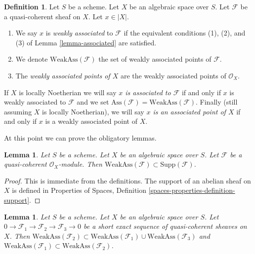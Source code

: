 \documentclass{stacks-project}
\theoremstyle{plain}
\newtheorem{lemma}[subsection]{Lemma}
\theoremstyle{definition}
\newtheorem{definition}[subsection]{Definition}
\theoremstyle{remark}
\numberwithin{equation}{subsection}
\begin{document}
\begin{definition}
\label{definition-weakly-associated}
Let $S$ be a scheme. Let $X$ be an algebraic space over $S$.
Let $\mathcal{F}$ be a quasi-coherent sheaf on $X$.
Let $x \in |X|$.
\begin{enumerate}
\item We say $x$ is {\it weakly associated} to $\mathcal{F}$
if the equivalent conditions (1), (2), and (3) of
Lemma \ref{lemma-associated} are satisfied.
\item We denote $\text{WeakAss}(\mathcal{F})$ the set of weakly associated
points of $\mathcal{F}$.
\item The {\it weakly associated points of $X$} are the weakly associated
points of $\mathcal{O}_X$.
\end{enumerate}
If $X$ is locally Noetherian we will say
{\it $x$ is associated to $\mathcal{F}$}
if and only if $x$ is weakly associated to $\mathcal{F}$ and we set
$\text{Ass}(\mathcal{F}) = \text{WeakAss}(\mathcal{F})$.
Finally (still assuming $X$ is locally Noetherian),
we will say {\it $x$ is an associated point of $X$} if and only if
$x$ is a weakly associated point of $X$.
\end{definition}

\noindent
At this point we can prove the obligatory lemmas.

\begin{lemma}
\label{lemma-weakly-ass-support}
Let $S$ be a scheme. Let $X$ be an algebraic space over $S$.
Let $\mathcal{F}$ be a quasi-coherent $\mathcal{O}_X$-module.
Then $\text{WeakAss}(\mathcal{F}) \subset \text{Supp}(\mathcal{F})$.
\end{lemma}

\begin{proof}
This is immediate from the definitions. The support of an abelian sheaf
on $X$ is defined in Properties of Spaces, Definition
\ref{spaces-properties-definition-support}.
\end{proof}

\begin{lemma}
\label{lemma-ses-weakly-ass}
Let $S$ be a scheme. Let $X$ be an algebraic space over $S$.
Let $0 \to \mathcal{F}_1 \to \mathcal{F}_2 \to \mathcal{F}_3 \to 0$
be a short exact sequence of quasi-coherent sheaves on $X$.
Then
$\text{WeakAss}(\mathcal{F}_2) \subset
\text{WeakAss}(\mathcal{F}_1) \cup \text{WeakAss}(\mathcal{F}_3)$
and
$\text{WeakAss}(\mathcal{F}_1) \subset \text{WeakAss}(\mathcal{F}_2)$.
\end{lemma}
\end{document}
